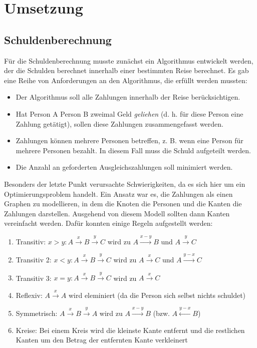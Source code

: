 \section {Umsetzung}

\subsection{Schuldenberechnung}

Für die Schuldenberechnung musste zunächst ein Algorithmus entwickelt werden, der die Schulden berechnet innerhalb einer bestimmten Reise berechnet.
Es gab eine Reihe von Anforderungen an den Algorithmus, die erfüllt werden mussten:

\begin{itemize}
\item Der Algorithmus soll alle Zahlungen innerhalb der Reise berücksichtigen.
\item Hat Person A Person B zweimal Geld \emph{geliehen} (d. h. für diese Person eine Zahlung getätigt), sollen diese Zahlungen zusammengefasst werden.
\item Zahlungen können mehrere Personen betreffen, z. B. wenn eine Person für mehrere Personen bezahlt. In diesem Fall muss die Schuld aufgeteilt werden.
\item Die Anzahl an geforderten Ausgleichszahlungen soll minimiert werden.
\end{itemize}

Besonders der letzte Punkt verursachte Schwierigkeiten, da es sich hier um ein Optimierungsproblem handelt.
Ein Ansatz war es, die Zahlungen als einen Graphen zu modellieren, in dem die Knoten die Personen und die Kanten die Zahlungen darstellen.
Ausgehend von diesem Modell sollten dann Kanten vereinfacht werden. Dafür konnten einige Regeln aufgestellt werden:

\begin{enumerate}
    \item Transitiv: $x>y:A \xrightarrow{x} B \xrightarrow{y} C$ wird zu $A \xrightarrow{x-y} B$ und $A \xrightarrow{y} C$
    \item Transitiv 2: $x<y:A \xrightarrow{x} B \xrightarrow{y} C$ wird zu $A \xrightarrow{x} C$ und $A \xrightarrow{y-x} C$
    \item Transitiv 3: $x=y:A \xrightarrow{x} B \xrightarrow{y} C$ wird zu $A \xrightarrow{x} C$
    \item Reflexiv: $A \xrightarrow{x} A$ wird eleminiert (da die Person sich selbst nichts schuldet)
    \item Symmetrisch: $A \xrightarrow{x} B \xrightarrow{y} A$ wird zu $A \xrightarrow{x-y} B$ (bzw. $A \xleftarrow{y-x} B$)
    \item Kreise: Bei einem Kreis wird die kleinste Kante entfernt und die restlichen Kanten um den Betrag der entfernten Kante verkleinert
\end{enumerate}

